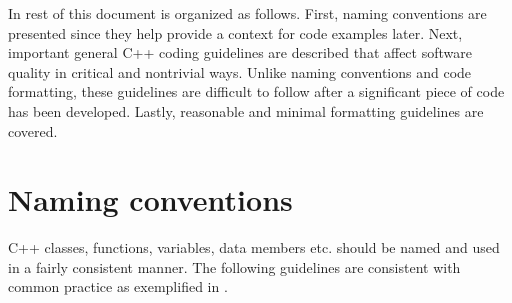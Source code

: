 In rest of this document is organized as follows.  First, naming conventions
are presented since they help provide a context for code examples later.
Next, important general C++ coding guidelines are described that affect
software quality in critical and nontrivial ways.  Unlike naming conventions
and code formatting, these guidelines are difficult to follow after a
significant piece of code has been developed.  Lastly, reasonable and minimal
formatting guidelines are covered.

%
\section{Naming conventions}
%

C++ classes, functions, variables, data members etc. should be named and used
in a fairly consistent manner.  The following guidelines are consistent with
common practice as exemplified in {}\cite{EffectiveC++3rd05}.

